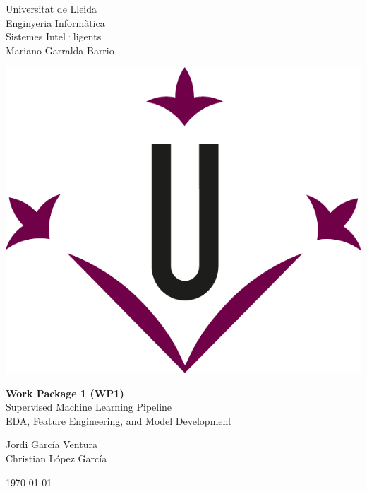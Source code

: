\documentclass[../main.tex]{subfiles}
\begin{document}
\begin{titlepage}
    \begin{minipage}[c]{0.4\linewidth}
    Universitat de Lleida \\
    Enginyeria Informàtica \\
    Sistemes Intel·ligents \\
    Mariano Garralda Barrio
    \end{minipage}
    \hfill
    \begin{minipage}[c]{0.5\linewidth}
    \hfill
    \includegraphics[width=0.4\linewidth]{media/figures//udl_logo.pdf}
    \end{minipage}
        
    \vspace{5cm}

     \begin{center}
        \Huge
        \textbf{Work Package 1 (WP1)} \\ Supervised Machine Learning Pipeline \\
        \vspace{1cm}
        \Large
        EDA, Feature Engineering, and Model Development
     \end{center}        
            
    \vspace{5cm}
        
    \begin{flushright}
        \large
        Jordi García Ventura \\
        Christian López García
    \end{flushright}
        
    \vfill
        
    \begin{center}
        \today
    \end{center}
\end{titlepage}
\end{document}

